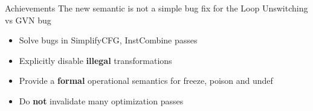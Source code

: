 \begin{frame}{Achievements}
The new semantic is not a simple bug fix for the Loop Unswitching vs GVN bug
    \begin{itemize}
        \item Solve bugs in SimplifyCFG, InstCombine passes
        \item Explicitly disable \textbf{illegal} transformations
        \item Provide a \textbf{formal} operational semantics for freeze, poison and undef
        \item Do \textbf{not} invalidate many optimization passes
    \end{itemize}
\end{frame}
